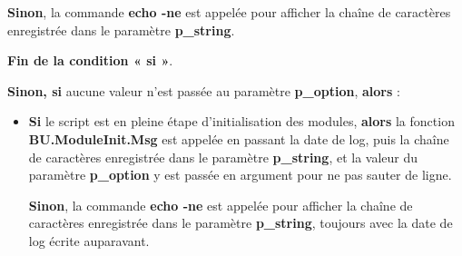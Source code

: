 \documentclass[a4paper,10pt]{article}
\begin{document}
\begin{itemize}
{\begin{itemize}
{\begin{itemize}
{                        \setlength{\parskip}{1em}

                        \begin{justify}
                            \textbf{\color{cond}Sinon}, la commande \textbf{\color{cmds}echo -ne} est appelée pour afficher la chaîne de caractères enregistrée dans le paramètre \textbf{\color{vars}p\_string}.
                        \end{justify}

                        \begin{justify}
                            \textbf{\color{cond}Fin de la condition « si »}.
                    \end{justify}
                    }
                \end{itemize}

                \item
                {
                    \setlength{\parskip}{2em}

                    \begin{justify}
                        \textbf{\color{case}Sinon, si} aucune valeur n'est passée au paramètre \textbf{\color{vars}p\_option}, \textbf{\color{case}alors} :
                    \end{justify}

                    \setlength{\parskip}{1em}
                }

                \begin{itemize}
                    \item
                    {
                        \begin{justify}
                            \textbf{\color{cond}Si} le script est en pleine étape d'initialisation des modules, \textbf{\color{cond}alors} la fonction \textbf{\color{func}BU.ModuleInit.Msg} est appelée en passant la date de log, puis la chaîne de caractères enregistrée dans le paramètre \textbf{\color{vars}p\_string}, et la valeur du paramètre \textbf{\color{vars}p\_option} y est passée en argument pour ne pas sauter de ligne.
                        \end{justify}

                        \setlength{\parskip}{1em}

                        \begin{justify}
                            \textbf{\color{cond}Sinon}, la commande \textbf{\color{cmds}echo -ne} est appelée pour afficher la chaîne de caractères enregistrée dans le paramètre \textbf{\color{vars}p\_string}, toujours avec la date de log écrite auparavant.
                        \end{justify}

}
\end{itemize}}
\end{itemize}}
\end{itemize}
\end{document}
